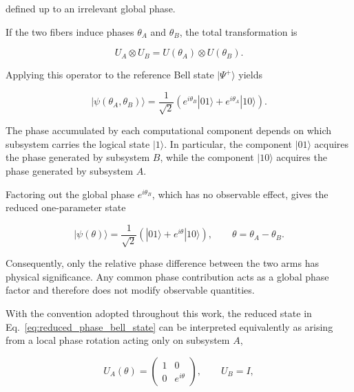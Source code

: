 defined up to an irrelevant global phase.

\medskip

If the two fibers induce phases \( \theta_A \) and \( \theta_B \), the total transformation is

\begin{equation}
U_A \otimes U_B
=
U(\theta_A) \otimes U(\theta_B).
\label{eq:two_arm_phase_unitary}
\end{equation}

Applying this operator to the reference Bell state \( |\Psi^+\rangle \) yields

\begin{equation}
|\psi(\theta_A,\theta_B)\rangle
=
\frac{1}{\sqrt{2}}
\left(
e^{i\theta_B}|01\rangle
+
e^{i\theta_A}|10\rangle
\right).
\label{eq:two_phase_bell_state}
\end{equation}

The phase accumulated by each computational component depends on which subsystem carries the logical state \( |1\rangle \).
In particular, the component \( |01\rangle \) acquires the phase generated by subsystem \( B \), while the component \( |10\rangle \) acquires the phase generated by subsystem \( A \).

\medskip

Factoring out the global phase \( e^{i\theta_B} \), which has no observable effect, gives the reduced one-parameter state

\begin{equation}
|\psi(\theta)\rangle
=
\frac{1}{\sqrt{2}}
\left(
|01\rangle
+
e^{i\theta}|10\rangle
\right),
\qquad
\theta = \theta_A - \theta_B.
\label{eq:reduced_phase_bell_state}
\end{equation}

Consequently, only the relative phase difference between the two arms has physical significance.
Any common phase contribution acts as a global phase factor and therefore does not modify observable quantities.

\medskip

With the convention adopted throughout this work, the reduced state in Eq.~\eqref{eq:reduced_phase_bell_state} can be interpreted equivalently as arising from a local phase rotation acting only on subsystem \( A \),

\begin{equation}
U_A(\theta)
=
\begin{pmatrix}
1 & 0\\
0 & e^{i\theta}
\end{pmatrix},
\qquad
U_B = I,
\label{eq:single_arm_phase_convention}
\end{equation}

